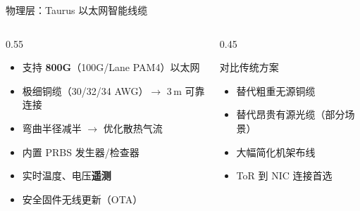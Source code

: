 \documentclass[aspectratio=169, 10pt, UTF8]{ctexbeamer}
\begin{document}
\begin{frame}{物理层：Taurus 以太网智能线缆}
  \begin{columns}[T]
    \begin{column}{0.55\textwidth}
      \begin{itemize}
        \item 支持 \textbf{800G}（100G/Lane PAM4）以太网
        \item 极细铜缆（30/32/34 AWG）$\to$ 3\,m 可靠连接
        \item 弯曲半径减半 $\to$ 优化散热气流
        \item 内置 PRBS 发生器/检查器
        \item 实时温度、电压\textbf{遥测}
        \item 安全固件无线更新（OTA）
      \end{itemize}
    \end{column}
    \begin{column}{0.45\textwidth}
      \begin{alertblock}{对比传统方案}
        \begin{itemize}
          \item 替代粗重无源铜缆
          \item 替代昂贵有源光缆（部分场景）
          \item 大幅简化机架布线
          \item ToR 到 NIC 连接首选
        \end{itemize}
      \end{alertblock}
    \end{column}
  \end{columns}
\end{frame}
\end{document}
